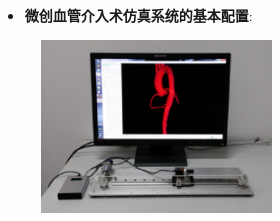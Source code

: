 
\begin{frame}
\begin{itemize}
  \item \textbf{微创血管介入术仿真系统的基本配置}: 
\end{itemize}
\begin{figure}[t]
\centering
\includegraphics[height=130pt]{../../Figures/background/simulator.eps}
\end{figure}
% 
\end{frame}

